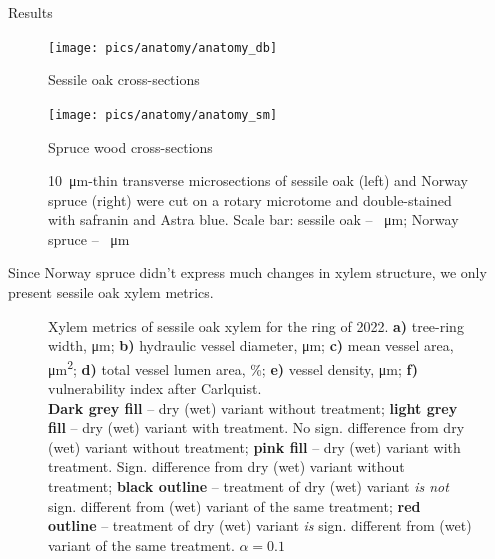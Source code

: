 \documentclass[final]{beamer}
\newlength{\colwidth}
\begin{document}
\begin{frame}[t]
\begin{columns}[t]
\begin{column}{\colwidth}
\begin{block}{Results}
    \begin{figure}
        \begin{minipage}{0.45\textwidth}
            \centering \texttt{[image: pics/anatomy/anatomy\_db]}
            \caption*{Sessile oak cross-sections}
            \label{fig:anatomy_db}
        \end{minipage}\hfill
        \begin{minipage}{0.45\textwidth}
            \centering \texttt{[image: pics/anatomy/anatomy\_sm]}
            \caption*{Spruce wood cross-sections}
            \label{fig:anatomy_sm}
        \end{minipage}\hfill
        \caption{\SI{10}{\micro\meter}-thin transverse microsections of sessile oak (left) and Norway spruce (right) were cut on a rotary microtome and double-stained with safranin and Astra blue. Scale bar: sessile oak -- \SI{}{\micro\meter}; Norway spruce -- \SI{}{\micro\meter}}
    \end{figure}
Since Norway spruce didn't express much changes in xylem structure, we only present sessile oak xylem metrics.
    \begin{figure}
        
        \caption{
            Xylem metrics of sessile oak xylem for the ring of 2022.
            \textbf{a)} tree-ring width, \si{\micro\meter};
            \textbf{b)} hydraulic vessel diameter, \si{\micro\meter};
            \textbf{c)} mean vessel area, \si{\micro\meter\squared};
            \textbf{d)} total vessel lumen area, \%;
            \textbf{e)} vessel density, \si{\micro\meter};
            \textbf{f)} vulnerability index after Carlquist. \\
            \textbf{Dark grey fill} -- dry (wet) variant without treatment;
            \textbf{light grey fill} -- dry (wet) variant with treatment. No sign. difference from dry (wet) variant without treatment;
            \textbf{pink fill} -- dry (wet) variant with treatment. Sign. difference from dry (wet) variant without treatment;
            \textbf{black outline} -- treatment of dry (wet) variant \emph{is not} sign. different from (wet) variant of the same treatment;
            \textbf{red outline} -- treatment of dry (wet) variant \emph{is} sign. different from (wet) variant of the same treatment.
            $\alpha = 0.1$
        }
        \label{fig:oak_box}
    \end{figure}
\end{block}


\end{column}
\end{columns}
\end{frame}
\end{document}
